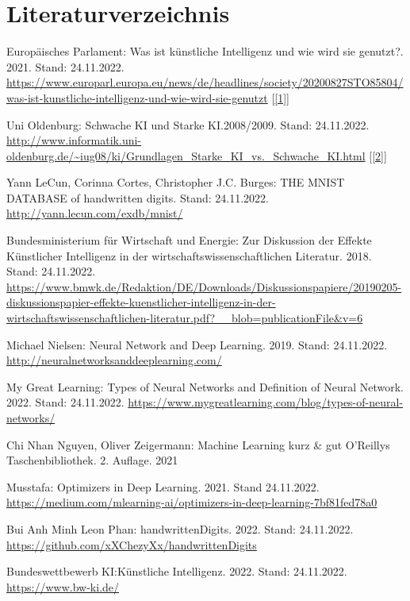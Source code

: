 \documentclass[11pt]{article}
\begin{document}
\section{Literaturverzeichnis}
{\renewcommand{\section}[2]{}
\hypersetup{linkcolor=red}
\renewcommand\UrlFont{\color{black}\normalfont}
\begin{thebibliography}{15}

    Europäisches Parlament: Was ist künstliche Intelligenz und wie wird sie genutzt?. 2021. Stand: 24.11.2022.
    \url{https://www.europarl.europa.eu/news/de/headlines/society/20200827STO85804/was-ist-kunstliche-intelligenz-und-wie-wird-sie-genutzt}
    [\ref{1}]
    
    Uni Oldenburg: Schwache KI und Starke KI.\@ 2008/2009. Stand: 24.11.2022.
    \url{http://www.informatik.uni-oldenburg.de/~iug08/ki/Grundlagen_Starke_KI_vs._Schwache_KI.html}
    [\ref{2}]

    Yann LeCun, Corinna Cortes, Christopher J.C. Burges: THE MNIST DATABASE of handwritten digits. Stand: 24.11.2022.
    \url{http://yann.lecun.com/exdb/mnist/}

    Bundesministerium für Wirtschaft und Energie: Zur Diskussion der Effekte Künstlicher Intelligenz in der wirtschaftswissenschaftlichen Literatur. 2018. Stand: 24.11.2022.
    \url{https://www.bmwk.de/Redaktion/DE/Downloads/Diskussionspapiere/20190205-diskussionspapier-effekte-kuenstlicher-intelligenz-in-der-wirtschaftswissenschaftlichen-literatur.pdf?__blob=publicationFile&v=6}

    Michael Nielsen: Neural Network and Deep Learning. 2019. Stand: 24.11.2022.
    \url{http://neuralnetworksanddeeplearning.com/}

    My Great Learning: Types of Neural Networks and Definition of Neural Network. 2022. Stand: 24.11.2022.
    \url{https://www.mygreatlearning.com/blog/types-of-neural-networks/}

    Chi Nhan Nguyen, Oliver Zeigermann: Machine Learning kurz \& gut O’Reillys Taschenbibliothek. 2. Auflage. 2021

    Musstafa: Optimizers in Deep Learning. 2021. Stand 24.11.2022.
    \url{https://medium.com/mlearning-ai/optimizers-in-deep-learning-7bf81fed78a0}

    Bui Anh Minh Leon Phan: handwrittenDigits. 2022. Stand: 24.11.2022.
    \url{https://github.com/xXChezyXx/handwrittenDigits}

    Bundeswettbewerb KI:\@ Künstliche Intelligenz. 2022. Stand: 24.11.2022.
    \url{https://www.bw-ki.de/}

\end{thebibliography}
}
\newpage
\end{document}

